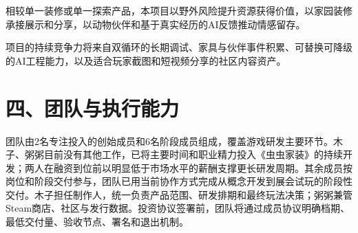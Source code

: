 \documentclass[UTF8,fontset=none,zihao=5,twoside]{ctexart}
\begin{document}
相较单一装修或单一探索产品，本项目以野外风险提升资源获得价值，以家园装修承接展示和分享，以动物伙伴和基于真实经历的AI反馈推动情感留存。

项目的持续竞争力将来自双循环的长期调试、家具与伙伴事件积累、可替换可降级的AI工程能力，以及适合玩家截图和短视频分享的社区内容资产。

\section{四、团队与执行能力}\label{ux56dbux56e2ux961fux4e0eux6267ux884cux80fdux529b}

团队由2名专注投入的创始成员和6名阶段成员组成，覆盖游戏研发主要环节。木子、粥粥目前没有其他工作，已将主要时间和职业精力投入《虫虫家装》的持续开发；两人在融资到位前以明显低于市场水平的薪酬支撑更长研发周期。其余成员按岗位和阶段交付参与，团队已用当前协作方式完成从概念开发到展会试玩的阶段性交付。木子担任制作人，统一负责产品范围、研发排期和最终玩法决策；粥粥兼管Steam商店、社区与发行数据。投资协议签署前，团队将通过成员协议明确档期、最低交付量、验收节点、署名和退出机制。
\end{document}
